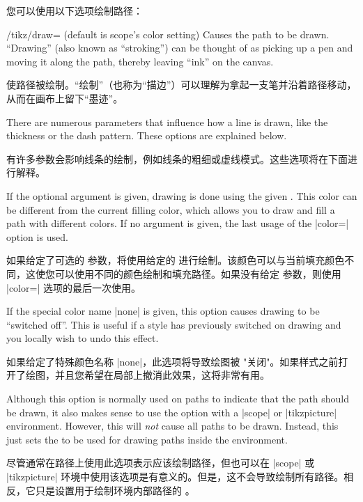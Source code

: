 您可以使用以下选项绘制路径：
%
\begin{key}{/tikz/draw= (default \normalfont is scope's color setting)}
    Causes the path to be drawn. ``Drawing'' (also known as ``stroking'') can
    be thought of as picking up a pen and moving it along the path, thereby
    leaving ``ink'' on the canvas.

    使路径被绘制。``绘制''（也称为``描边''）可以理解为拿起一支笔并沿着路径移动，从而在画布上留下``墨迹''。

    There are numerous parameters that influence how a line is drawn, like the
    thickness or the dash pattern. These options are explained below.

    有许多参数会影响线条的绘制，例如线条的粗细或虚线模式。这些选项将在下面进行解释。


    If the optional  argument is given, drawing is done using the
    given . This color can be different from the current filling
    color, which allows you to draw and fill a path with different colors. If
    no  argument is given, the last usage of the |color=| option is
    used.
    
    如果给定了可选的  参数，将使用给定的  进行绘制。该颜色可以与当前填充颜色不同，这使您可以使用不同的颜色绘制和填充路径。如果没有给定  参数，则使用 |color=| 选项的最后一次使用。

    If the special color name |none| is given, this option causes drawing to be
    ``switched off''. This is useful if a style has previously switched on
    drawing and you locally wish to undo this effect.

    如果给定了特殊颜色名称 |none|，此选项将导致绘图被 "关闭"。如果样式之前打开了绘图，并且您希望在局部上撤消此效果，这将非常有用。

    Although this option is normally used on paths to indicate that the path
    should be drawn, it also makes sense to use the option with a |{scope}| or
    |{tikzpicture}| environment. However, this will \emph{not} cause all paths
    to be drawn. Instead, this just sets the  to be used for
    drawing paths inside the environment.

    尽管通常在路径上使用此选项表示应该绘制路径，但也可以在 |{scope}| 或 |{tikzpicture}| 环境中使用该选项是有意义的。但是，这不会导致绘制所有路径。相反，它只是设置用于绘制环境内部路径的 。

\begin{codeexample}[]
\end{codeexample}
\end{key}

